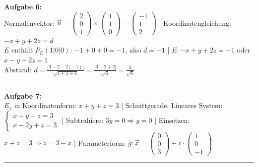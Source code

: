 \documentclass[12pt,a4paper]{article}
\newcommand{\vek}[1]{\vec{#1}}
\begin{document}
\textbf{Aufgabe 6:} \\
Normalenvektor: $\vek{n} = \begin{pmatrix}2\\0\\1\end{pmatrix} \times \begin{pmatrix}1\\1\\0\end{pmatrix} = \begin{pmatrix}-1\\1\\2\end{pmatrix}$ |
Koordinatengleichung: $-x + y + 2z = d$ \\
$E$ enthält $P_E(1|0|0)$: $-1+0+0 = -1$, also $d = -1$ |
$E: -x + y + 2z = -1$ oder $x - y - 2z = 1$ \\
Abstand: $d = \frac{|3-2-2(-1)|}{\sqrt{1+1+4}} = \frac{|3-2+2|}{\sqrt{6}} = \frac{3}{\sqrt{6}}$
\begin{center}\rule{0.8\linewidth}{0.4pt}\end{center}

\textbf{Aufgabe 7:} \\
$E_1$ in Koordinatenform: $x + y + z = 3$ |
Schnittgerade: Lineares System:
$\begin{cases} x + y + z = 3 \\ x - 2y + z = 3 \end{cases}$ |
Subtrahiere: $3y = 0 \Rightarrow y = 0$ |
Einsetzen: $x + z = 3 \Rightarrow z = 3 - x$ |
Parameterform: $g: \vek{x} = \begin{pmatrix}0\\0\\3\end{pmatrix} + r \cdot \begin{pmatrix}1\\0\\-1\end{pmatrix}$
\begin{center}\rule{0.8\linewidth}{0.4pt}\end{center}
\end{document}
